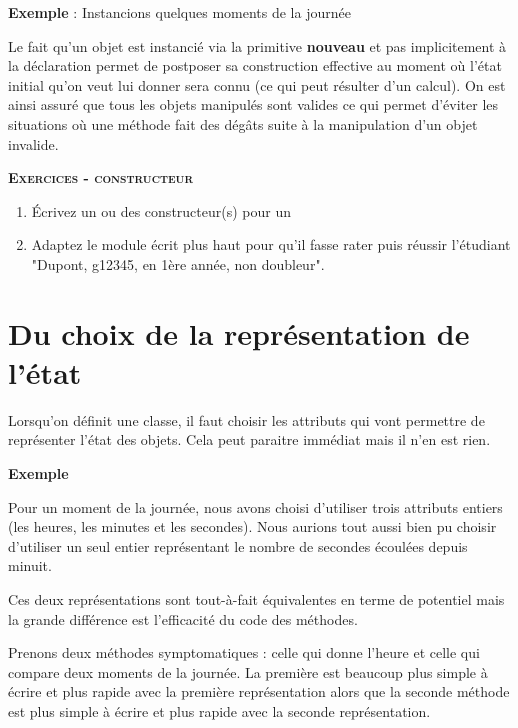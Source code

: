 {
\textbf{Exemple} : Instancions quelques moments de la journée}


{
Le fait qu'un objet est instancié via la primitive
\textbf{nouveau} et pas implicitement à la déclaration permet de
postposer sa construction effective au moment où
l'état initial qu'on veut lui donner
sera connu (ce qui peut résulter d'un calcul). On est
ainsi assuré que tous les objets manipulés sont valides ce qui permet
d’éviter les situations où une méthode fait des dégâts suite à la
manipulation d’un objet invalide.}

{\sffamily\bfseries\scshape
Exercices - constructeur}

\liststyleWWviiiNumi
\begin{enumerate}
\item {
Écrivez un ou des constructeur(s) pour un }
\item {
Adaptez le module écrit plus haut pour qu'il fasse rater 
puis réussir l'étudiant "Dupont, g12345, en 1ère année,
non doubleur".}
\end{enumerate}

\bigskip

\section{Du choix de la représentation de l'état}
{
Lorsqu'on définit une classe, il faut choisir les
attributs qui vont permettre de représenter l'état des
objets. Cela peut paraitre immédiat mais il n'en est
rien.}

{\bfseries
Exemple}

{
Pour un moment de la journée, nous avons choisi
d'utiliser trois attributs entiers (les heures, les
minutes et les secondes). Nous aurions tout aussi bien pu choisir
d'utiliser un seul entier représentant le nombre de
secondes écoulées depuis minuit.}

{
Ces deux représentations sont tout-à-fait équivalentes en terme de
potentiel mais la grande différence est l'efficacité
du code des méthodes. }

{
Prenons deux méthodes symptomatiques : celle qui donne
l'heure et celle qui compare deux moments de la
journée. La première est beaucoup plus simple à écrire et plus rapide
avec la première représentation alors que la seconde méthode est plus
simple à écrire et plus rapide avec la seconde représentation.}

